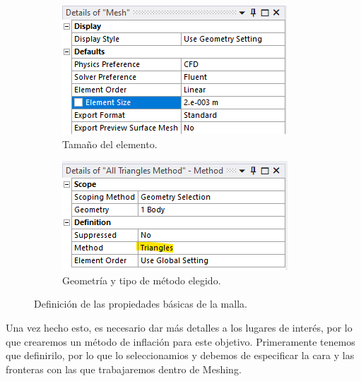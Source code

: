 \documentclass[12pt, letterpaper]{article}
\begin{document}
\begin{figure}[H]
	\centering
	\begin{subfigure}[b]{0.49\linewidth}
		\includegraphics[width=\linewidth]{3.png}
		\caption{Tamaño del elemento.}
	\end{subfigure}
	\begin{subfigure}[b]{0.49\linewidth}
		\includegraphics[width=\linewidth]{6.png}
		\caption{Geometría y tipo de método elegido.}
	\end{subfigure}
	\caption{Definición de las propiedades básicas de la malla.}
\end{figure}

Una vez hecho esto, es necesario dar más detalles a los lugares de interés, por lo que crearemos un método de inflación para este objetivo. Primeramente tenemos que definirilo, por lo que lo seleccionamios y debemos de especificar la cara y las fronteras con las que trabajaremos dentro de Meshing.
\end{document}
